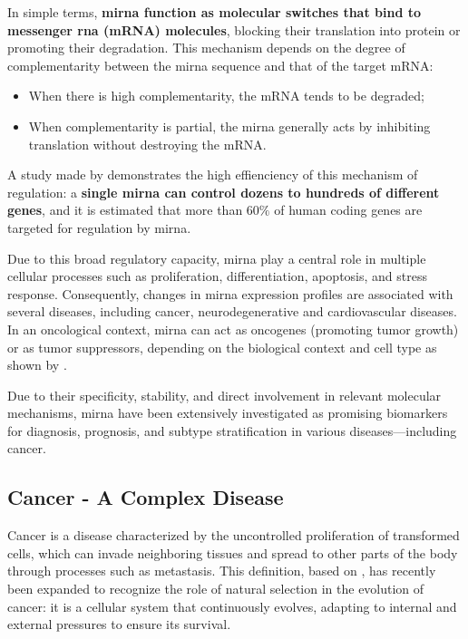 In simple terms, \textbf{\gls{mirna} function as molecular switches that bind
  to messenger \gls{rna} (mRNA) molecules}, blocking their translation into
protein or promoting their degradation. This mechanism depends on the degree of
complementarity between the \gls{mirna} sequence and that of the target mRNA:

\begin{itemize}
  \item When there is high complementarity, the mRNA tends to be degraded;
  \item When complementarity is partial, the \gls{mirna} generally acts by inhibiting
        translation without destroying the mRNA.
\end{itemize}

A study made by \textcite{role_mirna_Calaf2023} demonstrates the high
effienciency of this mechanism of regulation: a \textbf{single \gls{mirna} can
  control dozens to hundreds of different genes}, and it is estimated that more
than $60\%$ of human coding genes are targeted for regulation by \gls{mirna}.

Due to this broad regulatory capacity, \gls{mirna} play a central role in
multiple cellular processes such as proliferation, differentiation, apoptosis,
and stress response. Consequently, changes in \gls{mirna} expression profiles
are associated with several diseases, including cancer, neurodegenerative and
cardiovascular diseases. In an oncological context, \gls{mirna} can act as
oncogenes (promoting tumor growth) or as tumor suppressors, depending on the
biological context and cell type as shown by
\textcite{regulatory_mecha_mirnaGulyaeva2016}.

Due to their specificity, stability, and direct involvement in relevant
molecular mechanisms, \gls{mirna} have been extensively investigated as
promising biomarkers for diagnosis, prognosis, and subtype stratification in
various diseases—including cancer.

\subsection{Cancer - A Complex Disease}
Cancer is a disease characterized by the uncontrolled proliferation of
transformed cells, which can invade neighboring tissues and spread to other
parts of the body through processes such as metastasis. This definition, based
on \textcite{NCI2021,def_of_cancer_Brown2023}, has recently been expanded to
recognize the role of natural selection in the evolution of cancer: it is a
cellular system that continuously evolves, adapting to internal and external
pressures to ensure its survival.

